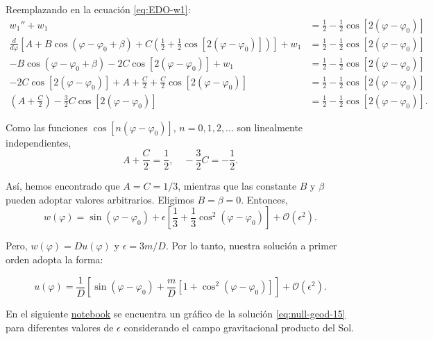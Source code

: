 \documentclass[letterpaper,11pt]{article}
\begin{document}
Reemplazando en la ecuación \eqref{eq:EDO-w1}:
\begin{align}
w_1'' + w_1 &=  \frac{1}{2} - \frac{1}{2}\cos[2(\varphi - \varphi_0)] \\
\frac{d}{d\varphi} \left[A + B \cos(\varphi - \varphi_0 + \beta) + C \left( \frac{1}{2} + \frac{1}{2} \cos[2(\varphi - \varphi_0)] \right)\right] + w_1 &=  \frac{1}{2} - \frac{1}{2}\cos[2(\varphi - \varphi_0)] \\
- B\cos(\varphi - \varphi_0 +\beta) - 2C \cos[2(\varphi - \varphi_0)] + w_1 &= \frac{1}{2} - \frac{1}{2}\cos[2(\varphi - \varphi_0)] \\
- 2C \cos[2(\varphi - \varphi_0)] + A + \frac{C}{2} + \frac{C}{2} \cos[2(\varphi - \varphi_0)] &= \frac{1}{2} - \frac{1}{2}\cos[2(\varphi - \varphi_0)]  \\
\left(A + \frac{C}{2}\right) -  \frac{3}{2}C \cos[2(\varphi - \varphi_0)] &= \frac{1}{2} - \frac{1}{2}\cos[2(\varphi - \varphi_0)].
\end{align}

Como las funciones $\cos[n(\varphi - \varphi_0)]$, $n = 0,1,2,\dots$ son linealmente independientes, 
\begin{equation}
 A + \frac{C}{2} = \frac{1}{2}, \quad -  \frac{3}{2}C = - \frac{1}{2}.
\end{equation}

Así, hemos encontrado que $A = C = 1/3$, mientras que las constante $B$ y $\beta$ pueden adoptar valores arbitrarios. Eligimos $B = \beta = 0$. Entonces,
\begin{equation}
w(\varphi) = \sin(\varphi - \varphi_0) + \epsilon \left[ \frac{1}{3} + \frac{1}{3}\cos^2(\varphi - \varphi_0)\right] + \mathcal{O}(\epsilon^2).
\end{equation}

Pero, $w(\varphi) = D u(\varphi)$ y $\epsilon = 3m/D$. Por lo tanto, nuestra solución a primer orden adopta la forma:
\begin{shaded}
\begin{equation}\label{eq:null-geod-15}
u(\varphi) = \frac{1}{D} \left[ \sin(\varphi - \varphi_0) + \frac{m}{D} \left[ 1 + \cos^2(\varphi-\varphi_0)\right] \right] + \mathcal{O}(\epsilon^2).
\end{equation}
\end{shaded}

En el siguiente \href{https://github.com/AleSaa66/Topicos-RG/blob/main/Semana%204/Semana-5.ipynb}{notebook} se encuentra un gráfico de la solución \eqref{eq:null-geod-15} para diferentes valores de $\epsilon$ considerando el campo gravitacional producto del Sol.
\end{document}
